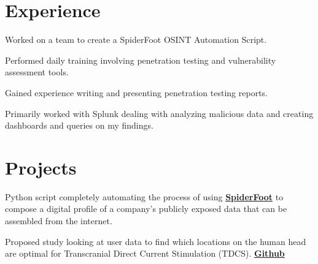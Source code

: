 \documentclass[]{deedy-resume-openfont}
\begin{document}
\begin{minipage}[t]{0.66\textwidth} 


\section{Experience}
\sectionsep

\vspace{\topsep} %
\begin{tightemize}
\item Worked on a team to create a SpiderFoot OSINT Automation Script.
\item Performed daily training involving penetration testing and vulnerability assessment tools. 
\item Gained experience writing and presenting penetration testing reports. 
\end{tightemize}
\sectionsep

\begin{tightemize}
\item Primarily worked with Splunk dealing with analyzing malicious data and creating dashboards and queries on my findings.
\end{tightemize}
\sectionsep


\section{Projects}
Python script completely automating the process of using \textbf{\href{https://www.spiderfoot.net/documentation/}{SpiderFoot}} to compose a digital profile of a company's publicly exposed data that can be assembled from the internet. 

Proposed study looking at user data to find which locations on the human head are optimal for Transcranial Direct Current Stimulation (TDCS). \textbf{\href{https://github.com/amvisca32/Brainjacking-Study}{Github}}


\end{minipage}
\end{document}
